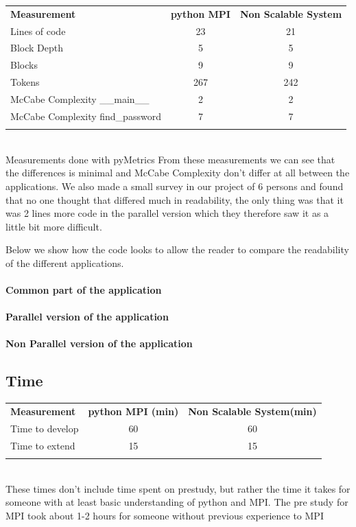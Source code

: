 \documentclass{article}
\begin{document}
{
\begin{tabular}{l c c}
  \rowcolor[gray]{0.5}
  {\bf Measurement} & {\bf python MPI} & {\bf Non Scalable System} \\
  Lines of code &  23  &  21 \\
  Block Depth   &   5  &   5  \\
  Blocks        &   9  &   9  \\
  Tokens        & 267  & 242  \\
  McCabe Complexity\cite{mccabe1976complexity} \_\_main\_\_ & 2  & 2 \\
  McCabe Complexity\cite{mccabe1976complexity} find\_password & 7  & 7  \\
\rowcolor[gray]{0.5}
\end{tabular}
\\\small{Measurements done with pyMetrics\cite{pymetrics}}
\newline
From these measurements we can see that the differences is minimal and
McCabe Complexity\cite{mccabe1976complexity} don't differ at all between
the applications. We also made a small survey in our project of 6 persons
and found that no one thought that differed much in readability, the only
thing was that it was 2 lines more code in the parallel version which they
therefore saw it as a little bit more difficult. 
\newline

Below we show how the code looks to allow the reader to compare the readability
of the different applications. 

\paragraph{Common part of the application}

\paragraph{Parallel version of the application}

\paragraph{Non Parallel version of the application}


\subsection{Time}
\begin{tabular}{l c c}
  \rowcolor[gray]{0.5}
  {\bf Measurement} & {\bf python MPI (min)} & {\bf Non Scalable System(min)} \\
  Time to develop &  60  &  60 \\
  Time to extend   &   15  &  15  \\
\rowcolor[gray]{0.5}
\end{tabular}
\\\small{These times don't include time spent on prestudy, but rather the time
it takes for someone with at least basic understanding of python and MPI. The
pre study for MPI took about 1-2 hours for someone without previous experience
to MPI}

}
\end{document}
